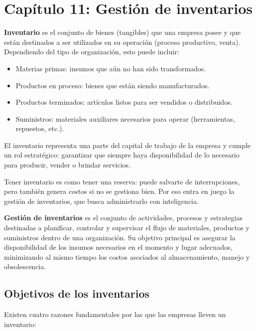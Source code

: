 \documentclass[a4paper,oneside,11pt]{article}
\begin{document}
\clearpage
\section{Capítulo 11: Gestión de inventarios}

\textbf{Inventario} es el conjunto de bienes (tangibles) que una empresa posee y que están destinados a ser utilizados en su operación (proceso productivo, venta). Dependiendo del tipo de organización, esto puede incluir:

\begin{itemize}
    \item Materias primas: insumos que aún no han sido transformados.
    \item Productos en proceso: bienes que están siendo manufacturados.
    \item Productos terminados: artículos listos para ser vendidos o distribuidos.
    \item Suministros: materiales auxiliares necesarios para operar (herramientas, repuestos, etc.).
\end{itemize}

El inventario representa una parte del capital de trabajo de la empresa y cumple un rol estratégico: garantizar que siempre haya disponibilidad de lo necesario para producir, vender o brindar servicios.

Tener inventario es como tener una reserva: puede salvarte de interrupciones, pero también genera costos si no se gestiona bien. Por eso entra en juego la gestión de inventarios, que busca administrarlo con inteligencia.

\textbf{Gestión de inventarios} es el conjunto de actividades, procesos y estrategias destinadas a planificar, controlar y supervisar el flujo de materiales, productos y suministros dentro de una organización. Su objetivo principal es asegurar la disponibilidad de los insumos necesarios en el momento y lugar adecuados, minimizando al mismo tiempo los costos asociados al almacenamiento, manejo y obsolescencia.


\subsection{Objetivos de los inventarios}
Existen cuatro razones fundamentales por las que las empresas lleven un inventario:
\end{document}
